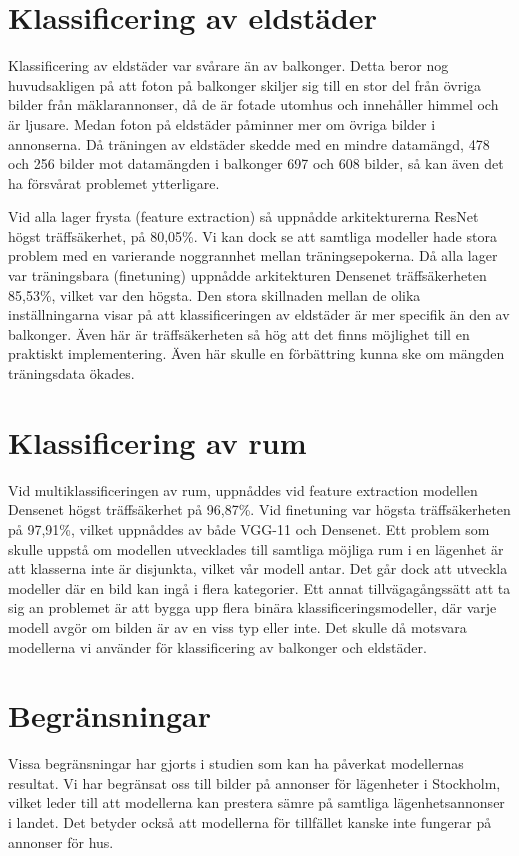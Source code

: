 \documentclass[]{kththesis}
\begin{document}
\section{Klassificering av eldstäder}
Klassificering av eldstäder var svårare än av balkonger. Detta beror nog huvudsakligen på att foton på balkonger skiljer sig till en stor del från övriga bilder från mäklarannonser, då de är fotade utomhus och innehåller himmel och är ljusare. Medan foton på eldstäder påminner mer om övriga bilder i annonserna. Då träningen av eldstäder skedde med en mindre datamängd, 478 och 256 bilder mot datamängden i balkonger 697 och 608 bilder, så kan även det ha försvårat problemet ytterligare. 

Vid alla lager frysta (feature extraction) så uppnådde arkitekturerna ResNet högst träffsäkerhet, på 80,05\%. Vi kan dock se att samtliga modeller hade stora problem med en varierande noggrannhet mellan träningsepokerna. Då alla lager var träningsbara (finetuning) uppnådde arkitekturen Densenet träffsäkerheten 85,53\%, vilket var den högsta. Den stora skillnaden mellan de olika inställningarna visar på att klassificeringen av eldstäder är mer specifik än den av balkonger. Även här är träffsäkerheten så hög att det finns möjlighet till en praktiskt implementering. Även här skulle en förbättring kunna ske om mängden träningsdata ökades.

\section{Klassificering av rum}
Vid multiklassificeringen av rum, uppnåddes vid feature extraction modellen Densenet högst träffsäkerhet på 96,87\%. Vid finetuning var högsta träffsäkerheten på 97,91\%, vilket uppnåddes av både VGG-11 och Densenet. Ett problem som skulle uppstå om modellen utvecklades till samtliga möjliga rum i en lägenhet är att klasserna inte är disjunkta, vilket vår modell antar. Det går dock att utveckla modeller där en bild kan ingå i flera kategorier. Ett annat tillvägagångssätt att ta sig an problemet är att bygga upp flera binära klassificeringsmodeller, där varje modell avgör om bilden är av en viss typ eller inte. Det skulle då motsvara modellerna vi använder för klassificering av balkonger och eldstäder. 

\section{Begränsningar}
Vissa begränsningar har gjorts i studien som kan ha påverkat modellernas resultat. Vi har begränsat oss till bilder på annonser för lägenheter i Stockholm, vilket leder till att modellerna kan prestera sämre på samtliga lägenhetsannonser i landet. Det betyder också att modellerna för tillfället kanske inte fungerar på annonser för hus.
\end{document}
